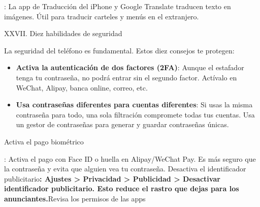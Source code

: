
: La app de Traducción del iPhone y Google Translate traducen texto en imágenes. Útil para traducir carteles y menús en el extranjero.

XXVII. Diez habilidades de seguridad

La seguridad del teléfono es fundamental. Estos diez consejos te protegen:

\begin{itemize}
  \item \textbf{Activa la autenticación de dos factores (2FA)}: Aunque el estafador tenga tu contraseña, no podrá entrar sin el segundo factor. Actívalo en WeChat, Alipay, banca online, correo, etc.
  \item \textbf{Usa contraseñas diferentes para cuentas diferentes}: Si usas la misma contraseña para todo, una sola filtración compromete todas tus cuentas. Usa un gestor de contraseñas para generar y guardar contraseñas únicas.
\end{itemize}

Activa el pago biométrico

\begin{tcbpractice}{: Activa el pago con Face ID o huella en Alipay/WeChat Pay. Es más seguro que la contraseña y evita que alguien vea tu contraseña.}
Desactiva el identificador publicitario\textbf{: Ajustes > Privacidad > Publicidad > Desactivar identificador publicitario. Esto reduce el rastro que dejas para los anunciantes.}Revisa los permisos de las apps

\end{tcbpractice}
